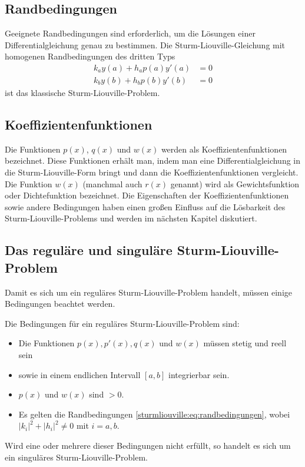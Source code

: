 \subsection{Randbedingungen
\label{sturmliouville:sub:was-ist-das-slp-randbedingungen}}
Geeignete Randbedingungen sind erforderlich, um die Lösungen einer
Differentialgleichung genau zu bestimmen.
Die Sturm-Liouville-Gleichung mit homogenen Randbedingungen des dritten Typs
\begin{equation}
	\begin{aligned}
		\label{sturmliouville:eq:randbedingungen}
		k_a y(a) + h_a p(a) y'(a) &= 0 \\
		k_b y(b) + h_b p(b) y'(b) &= 0
	\end{aligned}
\end{equation}
ist das klassische Sturm-Liouville-Problem.


\subsection{Koeffizientenfunktionen
\label{sturmliouville:sub:koeffizientenfunktionen}}
Die Funktionen $p(x)$, $q(x)$ und $w(x)$ werden als Koeffizientenfunktionen 
bezeichnet.
Diese Funktionen erhält man, indem man eine Differentialgleichung in die
Sturm-Liouville-Form bringt und dann die Koeffizientenfunktionen vergleicht.
Die Funktion $w(x)$ (manchmal auch $r(x)$ genannt) wird als Gewichtsfunktion
oder Dichtefunktion bezeichnet.
Die Eigenschaften der Koeffizientenfunktionen sowie andere Bedingungen haben
einen großen Einfluss auf die Lösbarkeit des Sturm-Liouville-Problems und werden
im nächsten Kapitel diskutiert.

%
%

\subsection{Das reguläre und singuläre Sturm-Liouville-Problem
\label{sturmliouville:sub:reguläre_sturm_liouville_problem}}
Damit es sich um ein reguläres Sturm-Liouville-Problem handelt, müssen einige
Bedingungen beachtet werden.
\begin{definition}
	\label{sturmliouville:def:reguläres_sturm-liouville-problem}
	Die Bedingungen für ein reguläres Sturm-Liouville-Problem sind:
	\begin{itemize}
		\item Die Funktionen $p(x), p'(x), q(x)$ und $w(x)$ müssen stetig und
		reell sein
		\item sowie in einem endlichen Intervall $[a,b]$ integrierbar
		sein.
		\item $p(x)$ und $w(x)$ sind $>0$.
		\item Es gelten die Randbedingungen 
		\eqref{sturmliouville:eq:randbedingungen}, wobei
		$|k_i|^2 + |h_i|^2\ne 0$ mit $i=a,b$.
	\end{itemize}
\end{definition}
Wird eine oder mehrere dieser Bedingungen nicht erfüllt, so handelt es sich um ein singuläres
Sturm-Liouville-Problem.

